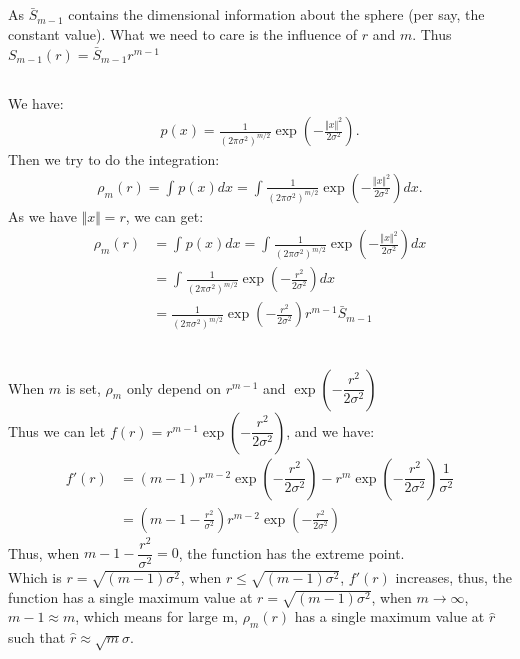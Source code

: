 \documentclass{article}
\begin{document}
\subsection{}
As $ \bar S_{m-1} $ contains the dimensional information about the sphere (per say, the constant value). What we need to care is the influence of $ r $ and $ m $. Thus $ S_{m - 1}(r) = \bar S_{m - 1} r^{m - 1} $
\subsection{}
We have:\\
\begin{align*}
    p(x) = \frac{1}{(2\pi \sigma ^2 )^{m/2}}\exp \left(-\frac{\Vert x\Vert^2}{2\sigma ^ 2}\right).
\end{align*}
Then we try to do the integration:
\begin{align*}
    \rho_m(r) = \displaystyle\int_{}^{}p(x)dx = \displaystyle\int_{}^{}\frac{1}{(2\pi \sigma ^2 )^{m/2}}\exp \left(-\frac{\Vert x\Vert^2}{2\sigma ^ 2}\right)dx.
\end{align*}
As we have $ \Vert x \Vert = r $, we can get:\\
\begin{align*}
    \rho_m(r) &= \displaystyle\int_{}^{}p(x)dx = \displaystyle\int_{}^{}\frac{1}{(2\pi \sigma ^2 )^{m/2}}\exp \left(-\frac{\Vert x\Vert^2}{2\sigma ^ 2}\right)dx\\
              &= \displaystyle\int_{}^{}\frac{1}{(2\pi \sigma ^2 )^{m/2}}\exp \left(-\frac{r^2}{2\sigma ^ 2}\right)dx\\
              &= \frac{1}{(2\pi \sigma ^2 )^{m/2}}\exp \left(-\frac{r^2}{2\sigma ^ 2}\right)r^{m-1}\bar S_{m - 1}\\
\end{align*}
\subsection{}
When $ m $ is set, $ \rho_m $ only depend on $ r^{m - 1} $ and $ \exp \left(-\dfrac{r^2}{2\sigma ^ 2}\right) $\\
Thus we can let $ f(r)=r^{m - 1}\exp {(-\dfrac{r^2}{2\sigma^2})} $, and we have:
\begin{align*}
    f'(r) &= (m - 1)r^{m - 2} \exp {(-\dfrac{r^2}{2\sigma^2})} - r^{m} \exp {(-\dfrac{r^2}{2\sigma^2})}\dfrac{1}{\sigma^2}\\
          &= (m - 1 - \frac{r^2 }{\sigma ^2 })r^{m - 2}\exp{(-\frac{r^2 }{2\sigma ^2})}
\end{align*}
Thus, when $ m - 1 - \dfrac{r^2}{\sigma ^2 } = 0 $, the function has the extreme point. \\
Which is $ r = \sqrt{(m - 1)\sigma ^2} $, when $ r\leq \sqrt{(m - 1)\sigma ^2} $, $ f'(r) $ increases, thus, the function has a single maximum value at $ r = \sqrt{(m - 1)\sigma ^2} $, when $ m\to \infty $, $ m - 1 \approx m $, which means for large m, $ \rho_m(r) $ has a single maximum value at $ \hat{r} $ such that $ \hat{r} \approx \sqrt{m} \sigma $.
\end{document}
